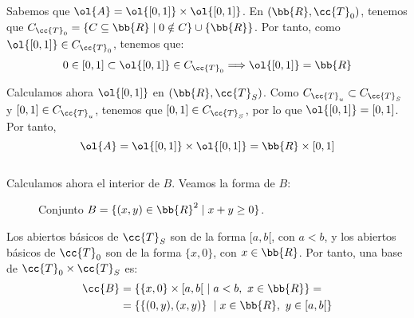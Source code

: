 \documentclass[12pt]{article}
\newcommand{\T}[0]{\cc{T}}
\begin{document}
\begin{ejercicio}[4 puntos]
\begin{enumerate}
            Sabemos que $\ol{A}=\ol{[0,1]}\times \ol{[0,1]}$. En $(\bb{R},\T_0)$, tenemos que $C_{\T_0}=\{C\subseteq \bb{R}\mid 0\notin C\}\cup \{\bb{R}\}$.
            Por tanto, como $\ol{[0,1]}\in C_{\T_0}$, tenemos que:
            \begin{equation*}
                0\in[0,1]\subset  \ol{[0,1]} \in C_{\T_0} \Longrightarrow \ol{[0,1]} = \bb{R}
            \end{equation*}

            Calculamos ahora $\ol{[0,1]}$ en $(\bb{R},\T_S)$. Como $C_{\T_u}\subset C_{\T_S}$ y $[0,1]\in C_{\T_u}$, tenemos que $[0,1]\in C_{\T_S}$,
            por lo que $\ol{[0,1]}=[0,1]$. Por tanto,
            \begin{equation*}
                \ol{A}=\ol{[0,1]}\times \ol{[0,1]} = \bb{R} \times [0,1]
            \end{equation*}\\

            Calculamos ahora el interior de $B$. Veamos la forma de $B$:
            \begin{figure}[H]
                \centering
                \caption{Conjunto $B=\{(x,y)\in\bb{R}^2\mid x+y\geq 0\}$.}
            \end{figure}
            

            Los abiertos básicos de $\T_S$ son de la forma $[a,b[$, con $a<b$,
            y los abiertos básicos de $\T_0$ son de la forma $\{x,0\}$, con $x\in \bb{R}$.
            Por tanto, una base de $\T_0\times \T_S$ es:
            \begin{align*}
                \cc{B} &= \{\{x,0\} \times [a,b[ ~\mid a<b,~ x\in \bb{R}\}
                =\\&= \{\{(0,y), (x,y)\} ~\mid x\in \bb{R},~y\in [a,b[\}
            \end{align*}


\end{enumerate}
\end{ejercicio}
\end{document}
